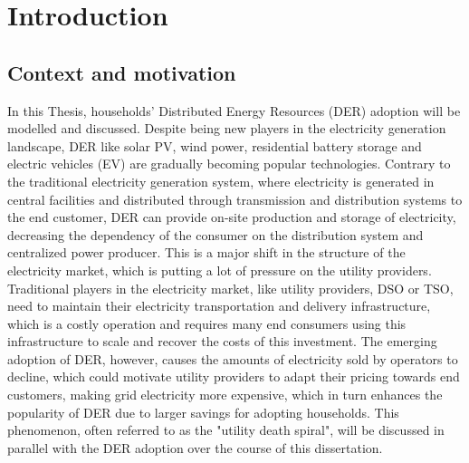 \chapter{Introduction}
\section{Context and motivation}
In this Thesis, households' Distributed Energy Resources (DER) adoption will be modelled and discussed. Despite being new players in the electricity generation landscape, DER like solar PV, wind power, residential battery storage and electric vehicles (EV) are gradually becoming popular technologies. Contrary to the traditional electricity generation system, where electricity is generated in central facilities and distributed through transmission and distribution systems to the end customer, DER can provide on-site production and storage of electricity, decreasing the dependency of the consumer on the distribution system and centralized power producer. This is a major shift in the structure of the electricity market, which is putting a lot of pressure on the utility providers. Traditional players in the electricity market, like utility providers, DSO or TSO, need to maintain their electricity transportation and delivery infrastructure, which is a costly operation and requires many end consumers using this infrastructure to scale and recover the costs of this investment. The emerging adoption of DER, however, causes the amounts of electricity sold by operators to decline, which could motivate utility providers to adapt their pricing towards end customers, making grid electricity more expensive, which in turn enhances the popularity of DER due to larger savings for adopting households. This phenomenon, often referred to as the "utility death spiral", will be discussed in parallel with the DER adoption over the course of this dissertation.
\newline \newline \noindent
